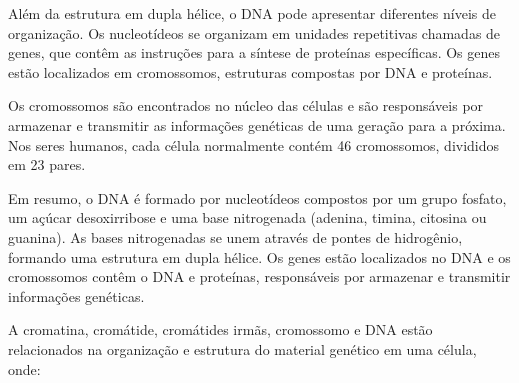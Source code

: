 \documentclass[11pt,a4paper]{article}
\begin{document}
	    Além da estrutura em dupla hélice, o DNA pode apresentar diferentes níveis de organização. Os nucleotídeos se organizam em unidades repetitivas chamadas de genes, que contêm as instruções para a síntese de proteínas específicas. Os genes estão localizados em cromossomos, estruturas compostas por DNA e proteínas.

	    Os cromossomos são encontrados no núcleo das células e são responsáveis por armazenar e transmitir as informações genéticas de uma geração para a próxima. Nos seres humanos, cada célula normalmente contém 46 cromossomos, divididos em 23 pares.

	    Em resumo, o DNA é formado por nucleotídeos compostos por um grupo fosfato, um açúcar desoxirribose e uma base nitrogenada (adenina, timina, citosina ou guanina). As bases nitrogenadas se unem através de pontes de hidrogênio, formando uma estrutura em dupla hélice. Os genes estão localizados no DNA e os cromossomos contêm o DNA e proteínas, responsáveis por armazenar e transmitir informações genéticas.

	    A cromatina, cromátide, cromátides irmãs, cromossomo e DNA estão relacionados na organização e estrutura do material genético em uma célula, onde:
\end{document}
